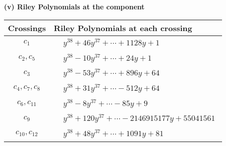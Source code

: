 \documentclass[1p]{elsarticle_modified}
\theoremstyle{definition}
\begin{document}
\flushleft \textbf{(v) Riley Polynomials at the component}\newline \\
\begin{tabular}{m{50pt}|m{274pt}}
Crossings & \hspace{64pt}Riley Polynomials at each crossing \\
\hline $$\begin{aligned}c_{1}\end{aligned}$$&$\begin{aligned}
&y^{38}+46 y^{37}+\cdots+1128 y+1
\end{aligned}$\\
\hline $$\begin{aligned}c_{2},c_{5}\end{aligned}$$&$\begin{aligned}
&y^{38}-10 y^{37}+\cdots+24 y+1
\end{aligned}$\\
\hline $$\begin{aligned}c_{3}\end{aligned}$$&$\begin{aligned}
&y^{38}-53 y^{37}+\cdots+896 y+64
\end{aligned}$\\
\hline $$\begin{aligned}c_{4},c_{7},c_{8}\end{aligned}$$&$\begin{aligned}
&y^{38}+31 y^{37}+\cdots-512 y+64
\end{aligned}$\\
\hline $$\begin{aligned}c_{6},c_{11}\end{aligned}$$&$\begin{aligned}
&y^{38}-8 y^{37}+\cdots-85 y+9
\end{aligned}$\\
\hline $$\begin{aligned}c_{9}\end{aligned}$$&$\begin{aligned}
&y^{38}+120 y^{37}+\cdots-2146915177 y+55041561
\end{aligned}$\\
\hline $$\begin{aligned}c_{10},c_{12}\end{aligned}$$&$\begin{aligned}
&y^{38}+48 y^{37}+\cdots+1091 y+81
\end{aligned}$\\
\hline
\end{tabular}\\~\\
\end{document}
